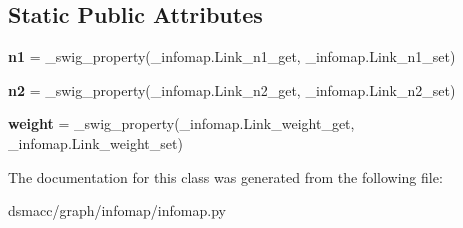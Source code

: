 \subsection*{Static Public Attributes}
\begin{DoxyCompactItemize}
\item 
\mbox{\label{classdsmacc_1_1graph_1_1infomap_1_1infomap_1_1Link_acb795095cc366a6cdf7861fa51fb58b5}} 
{\bfseries n1} = \+\_\+swig\+\_\+property(\+\_\+infomap.\+Link\+\_\+n1\+\_\+get, \+\_\+infomap.\+Link\+\_\+n1\+\_\+set)
\item 
\mbox{\label{classdsmacc_1_1graph_1_1infomap_1_1infomap_1_1Link_a1fbfad5c82d51535d2c434d818f3d0ff}} 
{\bfseries n2} = \+\_\+swig\+\_\+property(\+\_\+infomap.\+Link\+\_\+n2\+\_\+get, \+\_\+infomap.\+Link\+\_\+n2\+\_\+set)
\item 
\mbox{\label{classdsmacc_1_1graph_1_1infomap_1_1infomap_1_1Link_a8123e6008bbf827ef77db56db175b6ae}} 
{\bfseries weight} = \+\_\+swig\+\_\+property(\+\_\+infomap.\+Link\+\_\+weight\+\_\+get, \+\_\+infomap.\+Link\+\_\+weight\+\_\+set)
\end{DoxyCompactItemize}


The documentation for this class was generated from the following file\+:\begin{DoxyCompactItemize}
\item 
dsmacc/graph/infomap/infomap.\+py\end{DoxyCompactItemize}
